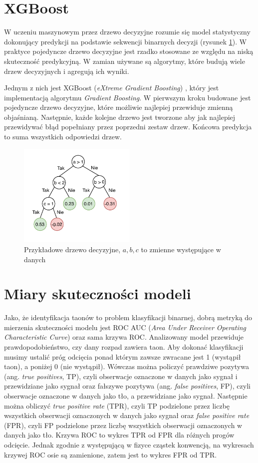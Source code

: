 \documentclass{pracalicmgr}
\begin{document}
	\section{XGBoost}
	W uczeniu maszynowym przez drzewo decyzyjne rozumie się model statystyczny dokonujący predykcji na podstawie sekwencji binarnych decyzji (rysunek \ref{fig:tree}). W praktyce pojedyncze drzewo decyzyjne jest rzadko stosowane ze względu na niską skuteczność predykcyjną. W zamian używane są algorytmy, które budują wiele drzew decyzyjnych i agregują ich wyniki.
	
	 Jednym z nich jest XGBoost (\textit{eXtreme Gradient Boosting}) \cite{xgboost}, który jest implementacją algorytmu \textit{Gradient Boosting}. W pierwszym kroku budowane jest pojedyncze drzewo decyzyjne, które możliwie najlepiej przewiduje zmienną objaśnianą. Następnie, każde kolejne drzewo jest tworzone aby jak najlepiej przewidywać błąd popełniany przez poprzedni zestaw drzew. Końcowa predykcja to suma wszystkich odpowiedzi drzew.
	
	\begin{figure}[h]
	\centering
	\includegraphics[width=0.5\textwidth]{tree.pdf}
	\caption{Przykładowe drzewo decyzyjne, $a, b, c$ to zmienne występujące w danych}
	\label{fig:tree}
	\end{figure}
	
	\section{Miary skuteczności modeli}
	Jako, że identyfikacja taonów to problem klasyfikacji binarnej, dobrą metryką do mierzenia skuteczności modelu jest ROC AUC (\textit{Area Under Receiver Operating Characteristic Curve}) oraz sama krzywa ROC. Analizowany model przewiduje prawdopodobieństwo, czy dany rozpad zawiera taon. Aby dokonać klasyfikacji musimy ustalić próg odcięcia ponad którym zawsze zwracane jest 1 (wystąpił taon), a poniżej 0 (nie wystąpił). Wówczas można policzyć prawdziwe pozytywa (ang. \textit{true positives}, TP), czyli obserwacje oznaczone w danych jako sygnał i przewidziane jako sygnał oraz fałszywe pozytywa (ang. \textit{false positives}, FP), czyli obserwacje oznaczone w danych jako tło, a przewidziane jako sygnał. Następnie można obliczyć \textit{true positive rate} (TPR), czyli TP podzielone przez liczbę wszystkich obserwacji oznaczonych w danych jako sygnał oraz \textit{false positive rate} (FPR), czyli FP podzielone przez liczbę wszystkich obserwacji oznaczonych w danych jako tło. Krzywa ROC to wykres TPR od FPR dla różnych progów odcięcie. Jednak zgodnie z występującą w fizyce cząstek konwencją, na wykresach krzywej ROC osie są zamienione, zatem jest to wykres FPR od TPR. 
	
\end{document}
